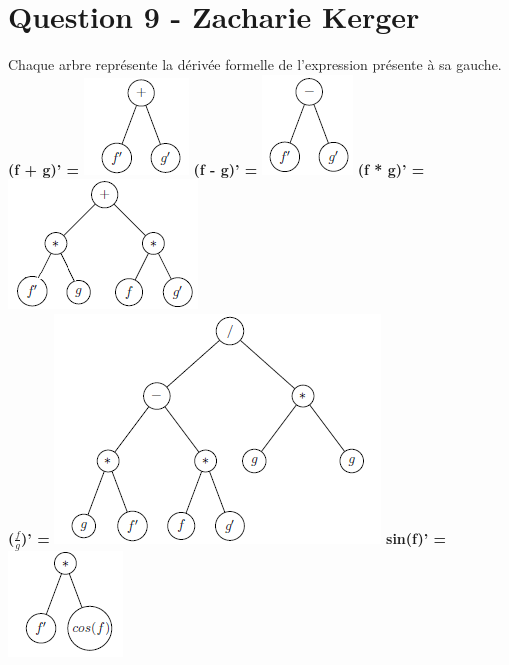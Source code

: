 \documentclass[10pt,a4paper]{article}
\begin{document}
\clearpage
\section*{Question 9 - Zacharie Kerger}

Chaque arbre représente la dérivée formelle de l'expression présente à sa gauche.\\

\textbf{(f + g)' =} \includegraphics[scale=1]{q9-f+g.png}
\textbf{(f - g)' =} \includegraphics[scale=1]{q9-f-g.png}
\textbf{(f * g)' =} \includegraphics[scale=1]{q9-fg.png} \\
\textbf{($\frac{f}{g}$)' =} \includegraphics[scale=1]{q9-fdivg.png}
\textbf{sin(f)' =} \includegraphics[scale=1]{q9-sinf.png} \\
\end{document}
